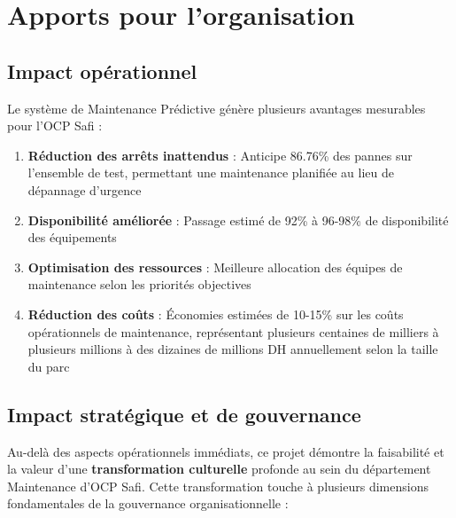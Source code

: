 \documentclass[a4paper,12pt]{report}
\begin{document}
\section{Apports pour l'organisation}

\subsection{Impact opérationnel}

Le système de Maintenance Prédictive génère plusieurs avantages mesurables pour l'OCP Safi :

\begin{enumerate}
    \item \textbf{Réduction des arrêts inattendus} : Anticipe 86.76\% des pannes sur l'ensemble de test, permettant une maintenance planifiée au lieu de dépannage d'urgence
    \item \textbf{Disponibilité améliorée} : Passage estimé de 92\% à 96-98\% de disponibilité des équipements
    \item \textbf{Optimisation des ressources} : Meilleure allocation des équipes de maintenance selon les priorités objectives
    \item \textbf{Réduction des coûts} : Économies estimées de 10-15\% sur les coûts opérationnels de maintenance, représentant plusieurs centaines de milliers à plusieurs millions à des dizaines de millions DH annuellement selon la taille du parc
\end{enumerate}

\subsection{Impact stratégique et de gouvernance}

Au-delà des aspects opérationnels immédiats, ce projet démontre la faisabilité et la valeur d'une \textbf{transformation culturelle} profonde au sein du département Maintenance d'OCP Safi. Cette transformation touche à plusieurs dimensions fondamentales de la gouvernance organisationnelle :
\end{document}
